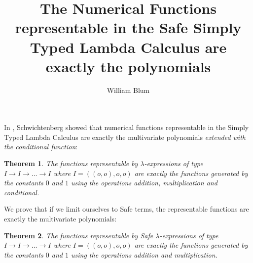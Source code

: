 \documentclass{article}
\author{William Blum}
\title{The Numerical Functions representable in the Safe Simply Typed Lambda Calculus are exactly the polynomials}
\newtheorem{theorem}{Theorem}[section]
\begin{document}
\maketitle

In \cite{citeulike:622637}, Schwichtenberg showed that 
numerical functions representable in the Simply Typed Lambda Calculus are exactly the multivariate polynomials \emph{extended with the conditional function}:
\begin{theorem}
The functions representable by $\lambda$-expressions of type $I\rightarrow I \rightarrow \ldots \rightarrow I$ where $I = ((o,o),o,o)$ are exactly the functions generated by the constants $0$ and $1$ using the operations addition, multiplication and conditional.
\end{theorem}

We prove that if we limit ourselves to Safe terms, the representable functions are exactly the multivariate polynomials:
\begin{theorem}
The functions representable by Safe $\lambda$-expressions of type $I\rightarrow I \rightarrow \ldots \rightarrow I$ where $I = ((o,o),o,o)$ are exactly the functions generated by the constants $0$ and $1$ using the operations addition and multiplication.
\end{theorem}
\end{document}

